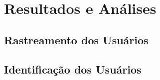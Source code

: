 \chapter{Resultados e Análises}




\section{Rastreamento dos Usuários}



\section{Identificação dos Usuários}













